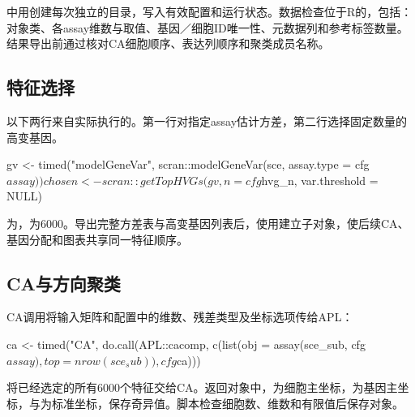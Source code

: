 \texttt{\fontsize{10}{12}\selectfont{}}中用\texttt{\fontsize{10}{12}\selectfont{}}创建每次独立的\texttt{\fontsize{10}{12}\selectfont{}}目录，写入有效配置和运行状态。数据检查位于R的\texttt{\fontsize{10}{12}\selectfont{}}，包括：对象类、各assay维数与取值、基因／细胞ID唯一性、元数据列和参考标签数量。结果导出前通过\texttt{\fontsize{10}{12}\selectfont{}}核对CA细胞顺序、表达列顺序和聚类成员名称。

\subsection{特征选择}
以下两行来自实际执行的\texttt{\fontsize{10}{12}\selectfont{}}。第一行对指定assay估计方差，第二行选择固定数量的高变基因。

\begin{ReportCode}
gv <- timed("modelGeneVar", scran::modelGeneVar(sce, assay.type = cfg$assay))
chosen <- scran::getTopHVGs(gv, n = cfg$hvg_n, var.threshold = NULL)
\end{ReportCode}

\texttt{\fontsize{10}{12}\selectfont{}}为\texttt{\fontsize{10}{12}\selectfont{}}，\texttt{\fontsize{10}{12}\selectfont{}}为\allowbreak{}6000。导出完整方差表与高变基因列表后，使用\texttt{\fontsize{10}{12}\selectfont{}}建立子对象，使后续CA、基因分配和图表共享同一特征顺序。

\subsection{CA与方向聚类}
CA调用将输入矩阵和配置中的维数、残差类型及坐标选项传给APL：

\begin{ReportCode}
ca <- timed("CA", do.call(APL::cacomp,
  c(list(obj = assay(sce_sub, cfg$assay), top = nrow(sce_sub)), cfg$ca)))
\end{ReportCode}

\texttt{\fontsize{10}{12}\selectfont{}}将已经选定的所有\allowbreak{}6000个特征交给CA。返回对象中，\texttt{\fontsize{10}{12}\selectfont{}}为细胞主坐标，\texttt{\fontsize{10}{12}\selectfont{}}为基因主坐标，\texttt{\fontsize{10}{12}\selectfont{}}与\texttt{\fontsize{10}{12}\selectfont{}}为标准坐标，\texttt{\fontsize{10}{12}\selectfont{}}保存奇异值。脚本检查细胞数、维数和有限值后保存对象。

